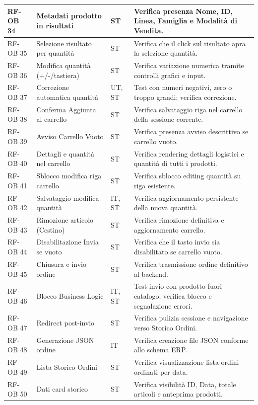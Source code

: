 \documentclass[a4paper,11pt,oneside]{scrartcl}
\begin{document}
\begin{longtable}{|p{1.5cm}|p{4.5cm}|p{1.8cm}|p{6cm}|}
RF-OB 34 & Metadati prodotto in risultati & ST & Verifica presenza Nome, ID, Linea, Famiglia e Modalità di Vendita. \\ \hline
RF-OB 35 & Selezione risultato per quantità & ST & Verifica che il click sul risultato apra la selezione quantità. \\ \hline
RF-OB 36 & Modifica quantità (+/-/tastiera) & ST & Verifica variazione numerica tramite controlli grafici e input. \\ \hline
RF-OB 37 & Correzione automatica quantità & UT, ST & Test con numeri negativi, zero o troppo grandi; verifica correzione. \\ \hline
RF-OB 38 & Conferma Aggiunta al carrello & ST & Verifica salvataggio riga nel carrello della sessione corrente. \\ \hline
RF-OB 39 & Avviso Carrello Vuoto & ST & Verifica presenza avviso descrittivo se carrello vuoto. \\ \hline
RF-OB 40 & Dettagli e quantità nel carrello & ST & Verifica rendering dettagli logistici e quantità di tutti i prodotti. \\ \hline
RF-OB 41 & Sblocco modifica riga carrello & ST & Verifica sblocco editing quantità su riga esistente. \\ \hline
RF-OB 42 & Salvataggio modifica quantità & IT, ST & Verifica aggiornamento persistente della nuova quantità. \\ \hline
RF-OB 43 & Rimozione articolo (Cestino) & ST & Verifica rimozione definitiva e aggiornamento carrello. \\ \hline
RF-OB 44 & Disabilitazione Invia se vuoto & ST & Verifica che il tasto invio sia disabilitato se carrello vuoto. \\ \hline
RF-OB 45 & Chiusura e invio ordine & ST & Verifica trasmissione ordine definitivo al backend. \\ \hline
RF-OB 46 & Blocco Business Logic & IT, ST & Test invio con prodotto fuori catalogo; verifica blocco e segnalazione errori. \\ \hline
RF-OB 47 & Redirect post-invio & ST & Verifica pulizia sessione e navigazione verso Storico Ordini. \\ \hline
RF-OB 48 & Generazione JSON ordine & IT & Verifica creazione file JSON conforme allo schema ERP. \\ \hline
RF-OB 49 & Lista Storico Ordini & ST & Verifica visualizzazione lista ordini ordinati per data. \\ \hline
RF-OB 50 & Dati card storico & ST & Verifica visibilità ID, Data, totale articoli e anteprima prodotti. \\ \hline

\end{longtable}
\end{document}
